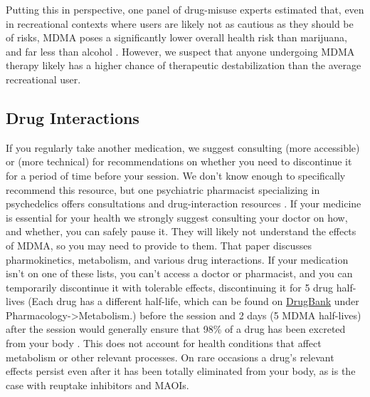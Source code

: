 \documentclass[12pt,letterpaper]{book}
\begin{document}
Putting this in perspective, one panel of drug-misuse experts estimated that, even in recreational contexts where users are likely not as cautious as they should be of risks, MDMA poses a significantly lower overall health risk than marijuana, and far less than alcohol \cite{nuttDrugHarms}. However, we suspect that anyone undergoing MDMA therapy likely has a higher chance of therapeutic destabilization than the average recreational user.

\subsection*{Drug Interactions}
If you regularly take another medication, we suggest consulting \textcite{liechtiInteractions} (more accessible) or \textcite{sarparastDrugInteractions} (more technical) for recommendations on whether you need to discontinue it for a period of time before your session. We don't know enough to specifically recommend this resource, but one psychiatric pharmacist specializing in psychedelics offers consultations and drug-interaction resources \cite{spiritPharmacist}. If your medicine is essential for your health we strongly suggest consulting your doctor on how, and whether, you can safely pause it. They will likely not understand the effects of MDMA, so you may need to provide \textcite{sarparastDrugInteractions} to them. That paper discusses pharmokinetics, metabolism, and various drug interactions. If your medication isn't on one of these lists, you can't access a doctor or pharmacist, and you can temporarily discontinue it with tolerable effects, discontinuing it for 5 drug half-lives (Each drug has a different half-life, which can be found on \href{https://go.drugbank.com}{DrugBank} under Pharmacology->Metabolism.) before the session and 2 days (5 MDMA half-lives) after the session would generally ensure that 98\% of a drug has been excreted from your body \cite{andradeHalf,torrePharmacology}. This does not account for health conditions that affect metabolism or other relevant processes. On rare occasions a drug's relevant effects persist even after it has been totally eliminated from your body, as is the case with reuptake inhibitors and MAOIs.
\end{document}
